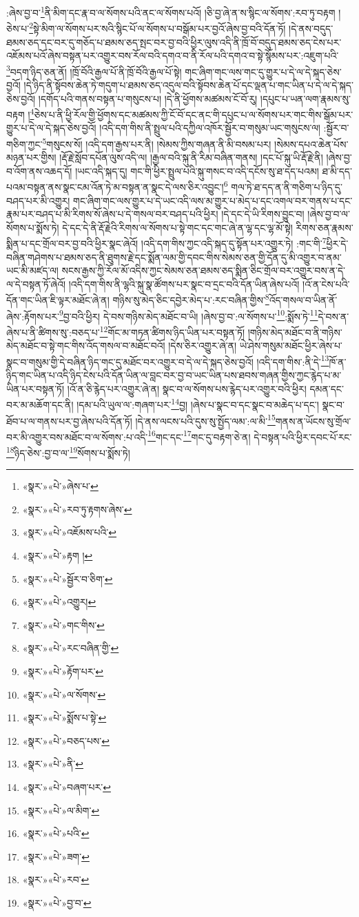 :ཞེས་བྱ་བ་\footnote{«སྣར་»«པེ་»ཞེས་པ་}ནི་མིག་དང་རྣ་བ་ལ་སོགས་པའི་ནང་ལ་སོགས་པའོ། །ཅི་བྱ་ཞེ་ན་ས་སྙིང་ལ་སོགས་:རབ་ཏུ་བརྟག །ཅེས་པ་\footnote{«སྣར་»«པེ་»རབ་ཏུ་རྟགས་ཞེས་}སྟེ་མིག་ལ་སོགས་པར་སའི་སྙིང་པོ་ལ་སོགས་པ་བསྒོམ་པར་བྱའོ་ཞེས་བྱ་བའི་དོན་ཏོ། །དེ་ནས་བདུད་ཐམས་ཅད་དང་བར་དུ་གཅོད་པ་ཐམས་ཅད་སྤང་བར་བྱ་བའི་ཕྱིར་ལུས་འདི་ནི་ཁྲོ་བོ་བདུད་ཐམས་ཅད་ངེས་པར་འཇོམས་པའོ་ཞེས་བསྟན་པར་འགྱུར་བས་རོལ་བའི་དགའ་བ་ནི་རོལ་པའི་དགའ་བ་སྟེ་སྙོམས་པར་:འཇུག་པའི་\footnote{«སྣར་»«པེ་»འཇོམས་པའི་}བདག་ཉིད་ཅན་ནོ། །ཁྲོ་བོའི་རྒྱལ་པོ་ནི་ཁྲོ་བོའི་རྒྱལ་པོ་སྟེ། གང་ཞིག་གང་ལས་གང་དུ་གྱུར་པ་དེ་ལ་དེ་སྐད་ཅེས་བྱའོ། །དེ་ཉིད་ནི་སྟོབས་ཆེན་ཏེ་གདུག་པ་ཐམས་ཅད་འདུལ་བའི་སྟོབས་ཆེན་པོ་དང་ལྡན་པ་གང་ཡིན་པ་དེ་ལ་དེ་སྐད་ཅེས་བྱའོ། །དགོད་པའི་གནས་བསྟན་པ་གསུངས་པ། །དེ་ནི་ཕྱོགས་མཚམས་ངོ་བོ་རུ། །དཔུང་པ་ཡན་ལག་རྣམས་སུ་བརྟག །\footnote{«སྣར་»«པེ་»རྟག །}ཅེས་པ་ནི་ཕྱི་རོལ་གྱི་ཕྱོགས་དང་མཚམས་ཀྱི་ངོ་བོ་དང་ནང་གི་དཔུང་པ་ལ་སོགས་པར་གང་གིས་སྒོམ་པར་གྱུར་པ་དེ་ལ་དེ་སྐད་ཅེས་བྱའོ། །འདི་དག་གིས་ནི་སྤྲུལ་པའི་དཀྱིལ་འཁོར་སྦྱོར་བ་གསུམ་ཡང་གསུངས་ལ། :སྦྱོར་བ་གཅིག་ཀྱང་\footnote{«སྣར་»«པེ་»སྦྱོར་བ་ཅིག་}གསུངས་སོ། །འདི་དག་རྒྱས་པར་ནི། །སེམས་ཀྱིས་གཞན་ནི་མི་བསམ་པར། །སེམས་དཔའ་ཆེན་པོས་མཉན་པར་གྱིས། །རྡོ་རྗེ་སློབ་དཔོན་ལུས་འདི་ལ། །རྒྱལ་བའི་སྐུ་ནི་རིམ་བཞིན་གནས། །དང་པོ་སྐུ་ཡི་རྡོ་རྗེ་ནི། །ཞེས་བྱ་བ་འོག་ནས་འཆད་དོ། །ཡང་འདི་སྐད་དུ། གང་གི་ཕྱིར་སྤྲུལ་པའི་སྐུ་གསང་བ་འདི་དངོས་སུ་ཐ་དད་པའམ། ཐ་མི་དད་པའམ་བསྟན་ནས་སྣང་ངམ་འོན་ཏེ་མ་བསྟན་ན་སྣང་དེ་ལས་ཅིར་འབྱུང་།\footnote{«སྣར་»«པེ་»འགྱུར།} གལ་ཏེ་ཐ་དད་ན་ནི་གཅིག་པ་ཉིད་དུ་བཤད་པར་མི་འགྱུར། གང་ཞིག་གང་ལས་གྱུར་པ་དེ་ཡང་འདི་ལས་མ་གྱུར་པ་མེད་པ་དང་འགལ་བར་གནས་པ་དང་རྣམ་པར་བཤད་པ་མི་རིགས་སོ་ཞེས་པ་དེ་གསལ་བར་བཤད་པའི་ཕྱིར། །དེ་དང་དེ་ཡི་རིགས་བྱུང་བ། །ཞེས་བྱ་བ་ལ་སོགས་པ་སྨོས་ཏེ། དེ་དང་དེ་ནི་རྡོ་རྗེའི་རིགས་ལ་སོགས་པ་སྟེ་གང་དང་གང་ཞེ་ན་ལྷ་དང་ལྷ་མོ་སྟེ། རིགས་ཅན་རྣམས་སྨིན་པ་དང་གྲོལ་བར་བྱ་བའི་ཕྱིར་སྣང་ཞེའོ། །འདི་དག་གིས་ཀྱང་འདི་སྐད་དུ་སྟོན་པར་འགྱུར་ཏེ། :གང་གི་\footnote{«སྣར་»«པེ་»གང་གིས་}ཕྱིར་དེ་བཞིན་གཤེགས་པ་ཐམས་ཅད་ནི་ཐུགས་རྗེ་དང་སྨོན་ལམ་གྱི་དབང་གིས་སེམས་ཅན་གྱི་དོན་དུ་མི་འགྱུར་བ་ནམ་ཡང་མི་མཛད་ལ། སངས་རྒྱས་ཀྱི་རོལ་མོ་འདིས་ཀྱང་སེམས་ཅན་ཐམས་ཅད་སྨིན་ཅིང་གྲོལ་བར་འགྱུར་བས་ན་དེ་ལ་དེ་བསྟན་ཏོ་ཞེའོ། །འདི་དག་གིས་ནི་ལྷའི་སྐུ་སྣ་ཚོགས་པར་སྣང་བ་དྲང་བའི་དོན་ཡིན་ཞེས་པའོ། །འོ་ན་ངེས་པའི་དོན་གང་ཡིན་ཇི་ལྟར་མཐོང་ཞེ་ན། གཉིས་སུ་མེད་ཅིང་དབྱེར་མེད་པ་:རང་བཞིན་གྱིས་\footnote{«སྣར་»«པེ་»རང་བཞིན་གྱི་}འོད་གསལ་བ་ཡིན་ནོ་ཞེས་:རྟོགས་པར་\footnote{«སྣར་»«པེ་»རྟོག་པར་}བྱ་བའི་ཕྱིར། དེ་བས་གཉིས་མེད་མཐོང་བ་ཡི། །ཞེས་བྱ་བ་:ལ་སོགས་པ་\footnote{«སྣར་»«པེ་»ལ་སོགས་}:སྨོས་ཏེ་\footnote{«སྣར་»«པེ་»སྨོས་པ་སྟེ་}དེ་བས་ན་ཞེས་པ་ནི་ཚིགས་སུ་:བཅད་པ་\footnote{«སྣར་»«པེ་»བཅད་པས་}གོང་མ་གཏན་ཚིགས་ཉིད་ཡིན་པར་བསྟན་ཏོ། །གཉིས་མེད་མཐོང་བ་ནི་གཉིས་མེད་མཐོང་བ་སྟེ་གང་གིས་འོད་གསལ་བ་མཐོང་བའོ། །དེས་ཅིར་འགྱུར་ཞེ་ན། ཡེ་ཤེས་གསུམ་མཐོང་ཕྱིར་ཞེས་པ་སྣང་བ་གསུམ་གྱི་དེ་བཞིན་ཉིད་གང་དུ་མཐོང་བར་འགྱུར་བ་དེ་ལ་དེ་སྐད་ཅེས་བྱའོ། །འདི་དག་གིས་:ནི་དེ་\footnote{«སྣར་»«པེ་»ནི་}ཁོ་ན་ཉིད་གང་ཡིན་པ་འདི་ཉིད་ངེས་པའི་དོན་ཡིན་ལ་བླང་བར་བྱ་བ་ཡང་ཡིན་པས་ཐབས་གཞན་གྱིས་ཀྱང་རྙེད་པ་མ་ཡིན་པར་བསྟན་ཏོ། །འོ་ན་ཅི་རྙེད་པར་འགྱུར་ཞེ་ན། སྣང་བ་ལ་སོགས་པས་རྙེད་པར་འགྱུར་བའི་ཕྱིར། དམན་དང་བར་མ་མཆོག་དང་ནི། །དམ་པའི་ཡུལ་ལ་:གཞག་པར་\footnote{«སྣར་»«པེ་»བཞག་པར་}བྱ། །ཞེས་པ་སྣང་བ་དང་སྣང་བ་མཆེད་པ་དང་། སྣང་བ་ཐོབ་པ་ལ་གནས་པར་བྱ་ཞེས་པའི་དོན་ཏོ། །དེ་ནས་ལངས་པའི་དུས་སུ་སྤྱོད་ལམ་:ལ་མི་\footnote{«སྣར་»«པེ་»ལ་མིག་}གནས་ན་ཡོངས་སུ་གྲོལ་བར་མི་འགྱུར་བས་མཐོང་བ་ལ་སོགས་:པ་འདི་\footnote{«སྣར་»«པེ་»པའི་}གང་དང་\footnote{«སྣར་»«པེ་»ཟག་}གང་དུ་བརྟག་ཅེ་ན། དེ་བསྟན་པའི་ཕྱིར་དབང་པོ་རང་\footnote{«སྣར་»«པེ་»རབ་}ཉིད་ཅེས་:བྱ་བ་ལ་\footnote{«སྣར་»«པེ་»བྱ་བ་}སོགས་པ་སྨོས་ཏེ། 
